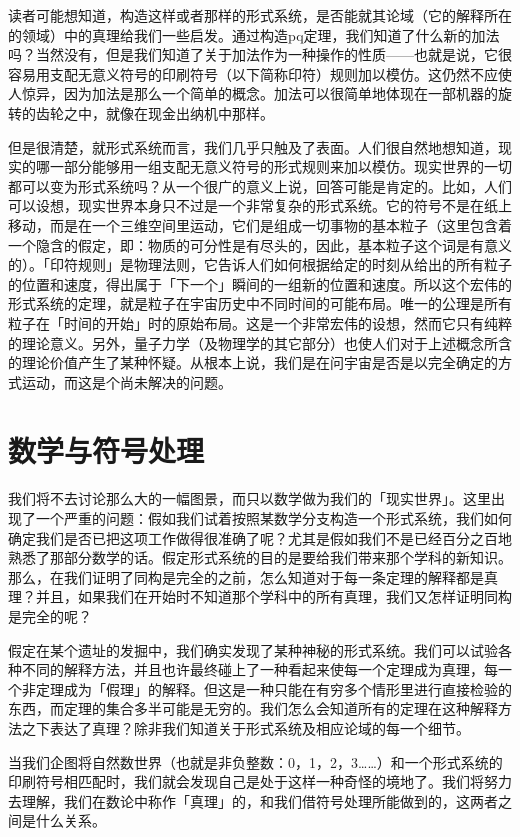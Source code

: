 \documentclass[
  12pt,
  twoside,
  openright,
  oldfontcommands,
]{memoir}
\begin{document}
读者可能想知道，构造这样或者那样的形式系统，是否能就其论域（它的解释所在的领域）中的真理给我们一些启发。通过构造pq定理，我们知道了什么新的加法吗？当然没有，但是我们知道了关于加法作为一种操作的性质------也就是说，它很容易用支配无意义符号的印刷符号（以下简称印符）规则加以模仿。这仍然不应使人惊异，因为加法是那么一个简单的概念。加法可以很简单地体现在一部机器的旋转的齿轮之中，就像在现金出纳机中那样。

但是很清楚，就形式系统而言，我们几乎只触及了表面。人们很自然地想知道，现实的哪一部分能够用一组支配无意义符号的形式规则来加以模仿。现实世界的一切都可以变为形式系统吗？从一个很广的意义上说，回答可能是肯定的。比如，人们可以设想，现实世界本身只不过是一个非常复杂的形式系统。它的符号不是在纸上移动，而是在一个三维空间里运动，它们是组成一切事物的基本粒子（这里包含着一个隐含的假定，即：物质的可分性是有尽头的，因此，基本粒子这个词是有意义的）。「印符规则」是物理法则，它告诉人们如何根据给定的时刻从给出的所有粒子的位置和速度，得出属于「下一个」瞬间的一组新的位置和速度。所以这个宏伟的形式系统的定理，就是粒子在宇宙历史中不同时间的可能布局。唯一的公理是所有粒子在「时间的开始」时的原始布局。这是一个非常宏伟的设想，然而它只有纯粹的理论意义。另外，量子力学（及物理学的其它部分）也使人们对于上述概念所含的理论价值产生了某种怀疑。从根本上说，我们是在问宇宙是否是以完全确定的方式运动，而这是个尚未解决的问题。

\section{数学与符号处理}

我们将不去讨论那么大的一幅图景，而只以数学做为我们的「现实世界」。这里出现了一个严重的问题：假如我们试着按照某数学分支构造一个形式系统，我们如何确定我们是否已把这项工作做得很准确了呢？尤其是假如我们不是已经百分之百地熟悉了那部分数学的话。假定形式系统的目的是要给我们带来那个学科的新知识。那么，在我们证明了同构是完全的之前，怎么知道对于每一条定理的解释都是真理？并且，如果我们在开始时不知道那个学科中的所有真理，我们又怎样证明同构是完全的呢？

假定在某个遗址的发掘中，我们确实发现了某种神秘的形式系统。我们可以试验各种不同的解释方法，并且也许最终碰上了一种看起来使每一个定理成为真理，每一个非定理成为「假理」的解释。但这是一种只能在有穷多个情形里进行直接检验的东西，而定理的集合多半可能是无穷的。我们怎么会知道所有的定理在这种解释方法之下表达了真理？除非我们知道关于形式系统及相应论域的每一个细节。

当我们企图将自然数世界（也就是非负整数：0，1，2，3\ldots\ldots）和一个形式系统的印刷符号相匹配时，我们就会发现自己是处于这样一种奇怪的境地了。我们将努力去理解，我们在数论中称作「真理」的，和我们借符号处理所能做到的，这两者之间是什么关系。
\end{document}

